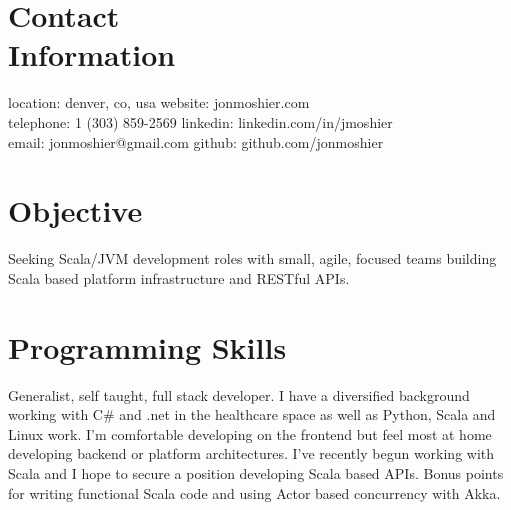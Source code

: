 \documentclass[margin,line]{resume}
\begin{document}
\begin{resume}

    \section{\mysidestyle Contact\\Information}
    location: denver, co, usa   \hfill website: jonmoshier.com\vspace{0mm}\\\vspace{0mm}%
    telephone: 1 (303) 859-2569 \hfill linkedin: linkedin.com/in/jmoshier\vspace{0mm}\\\vspace{0mm}%
    email: jonmoshier@gmail.com \hfill github: github.com/jonmoshier\vspace{0mm}\\\vspace{-4.5mm}%

    \section{\mysidestyle Objective}
 Seeking Scala/JVM development roles with small, agile, focused teams building Scala based platform infrastructure and RESTful APIs.
    \section{\mysidestyle Programming Skills} 
	Generalist, self taught, full stack developer. I have a diversified background working with C\# and .net in the healthcare space as well as Python, Scala and Linux work. I'm comfortable developing on the frontend but feel most at home developing backend or platform architectures. I've recently begun working with Scala and I hope to secure a position developing Scala based APIs. Bonus points for writing functional Scala code and using Actor based concurrency with Akka.

\end{resume}
\end{document}
